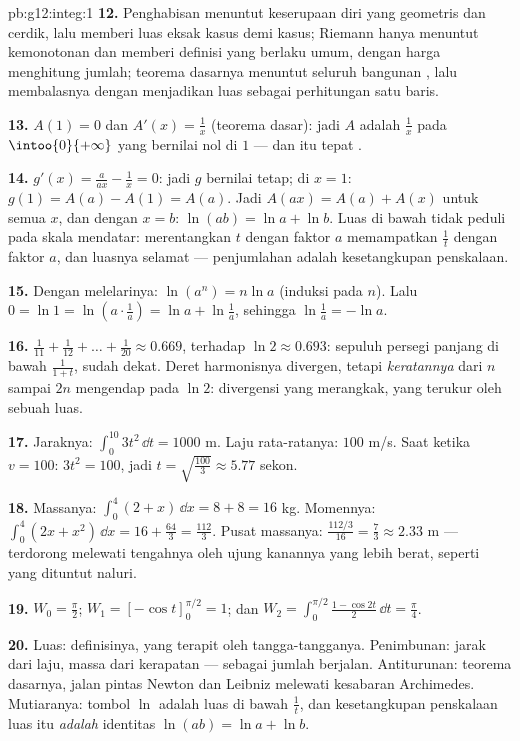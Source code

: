 \begin{solution}{pb:g12:integ:1}
\textbf{12.} Penghabisan menuntut keserupaan diri yang geometris
dan cerdik, lalu memberi luas eksak kasus demi kasus; Riemann
hanya menuntut kemonotonan dan memberi definisi yang berlaku umum, dengan
harga menghitung jumlah; teorema dasarnya menuntut
seluruh bangunan , lalu membalasnya dengan menjadikan luas
sebagai perhitungan satu baris.

\textbf{13.} $A(1) = 0$ dan $A'(x) = \frac1x$ (teorema
dasar): jadi $A$ adalah  $\frac1x$ pada
$\intoo{0}{+\infty}$ yang bernilai nol di $1$ --- dan itu tepat
.

\textbf{14.} $g'(x) = \frac{a}{ax} - \frac1x = 0$: jadi $g$
bernilai tetap; di $x = 1$: $g(1) = A(a) - A(1) = A(a)$. Jadi
$A(ax) = A(a) + A(x)$ untuk semua $x$, dan dengan $x = b$:
$\ln(ab) = \ln a + \ln b$. Luas di bawah  tidak peduli
pada skala mendatar: merentangkan $t$ dengan faktor $a$ memampatkan
$\frac1t$ dengan faktor $a$, dan luasnya selamat --- penjumlahan
 adalah kesetangkupan penskalaan.

\textbf{15.} Dengan melelarinya: $\ln(a^n) = n\ln a$ (induksi pada
$n$). Lalu $0 = \ln 1 = \ln\left(a \cdot \frac1a\right) =
\ln a + \ln\frac1a$, sehingga $\ln\frac1a = -\ln a$.

\textbf{16.} $\frac{1}{11} + \frac{1}{12} + \dots +
\frac{1}{20} \approx 0.669$, terhadap $\ln 2 \approx 0.693$:
sepuluh persegi panjang di bawah $\frac{1}{1+t}$, sudah dekat.
Deret harmonisnya divergen, tetapi \emph{keratannya} dari $n$ sampai
$2n$ mengendap pada $\ln 2$: divergensi yang merangkak, yang terukur oleh
sebuah luas.

\textbf{17.} Jaraknya: $\int_0^{10} 3t^2\,\dd t = 1000$ m.
Laju rata-ratanya: $100$ m/s. Saat ketika $v = 100$:
$3t^2 = 100$, jadi $t = \sqrt{\frac{100}{3}} \approx 5.77$ sekon.

\textbf{18.} Massanya: $\int_0^4 (2 + x)\,\dd x = 8 + 8 = 16$ kg.
Momennya: $\int_0^4 (2x + x^2)\,\dd x = 16 + \frac{64}{3} =
\frac{112}{3}$. Pusat massanya:
$\frac{112/3}{16} = \frac73 \approx 2.33$ m --- terdorong melewati
tengahnya oleh ujung kanannya yang lebih berat, seperti yang dituntut naluri.

\textbf{19.} $W_0 = \frac\pi2$; $W_1 = \left[-\cos
t\right]_0^{\pi/2} = 1$; dan
$W_2 = \int_0^{\pi/2} \frac{1 - \cos 2t}{2}\,\dd t =
\frac\pi4$.

\textbf{20.} Luas: definisinya, yang terapit oleh tangga-tangganya.
Penimbunan: jarak dari laju, massa dari kerapatan ---
 sebagai jumlah berjalan. Antiturunan: teorema
dasarnya, jalan pintas Newton dan Leibniz melewati
kesabaran Archimedes. Mutiaranya: tombol $\ln$ adalah luas
di bawah $\frac1t$, dan kesetangkupan penskalaan luas itu \emph{adalah}
identitas $\ln(ab) = \ln a + \ln b$.

\end{solution}
